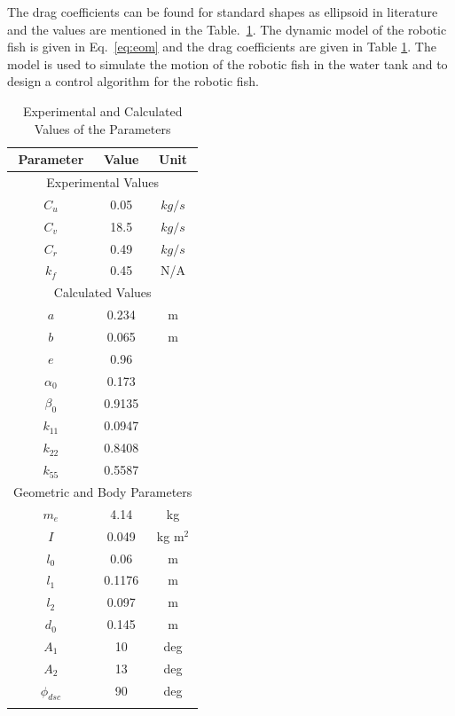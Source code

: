 \documentclass[pdflatex,sn-mathphys-num]{sn-jnl}
\theoremstyle{thmstyleone}%
\begin{document}
\par The drag coefficients can be found for standard shapes as ellipsoid in literature and the values are mentioned in the Table.~\ref{tab:exp_vals}. The dynamic model of the robotic fish is given in Eq.~\ref{eq:eom} and the drag coefficients are given in Table \ref{tab:exp_vals}. The model is used to simulate the motion of the robotic fish in the water tank and to design a control algorithm for the robotic fish.
\begin{table}[ht]
    \centering
    \begin{tabular}[width=\linewidth]{ccc}
        \toprule
        Parameter & Value & Unit \\
        \midrule
        \multicolumn{3}{c}{Experimental Values} \\
        \midrule
        $C_u$ & 0.05 & $kg/s$ \\
        $C_v$ & 18.5 & $kg/s$ \\
        $C_r$ & 0.49 & $kg/s$ \\
        $k_f$ & 0.45 & N/A \\
        \midrule
        \multicolumn{3}{c}{Calculated Values} \\
        \midrule
        $a$ & 0.234 & m \\
        $b$ & 0.065 & m \\
        $e$ & 0.96 & \\
        $\alpha_0$ & 0.173 & \\
        $\beta_0$ & 0.9135 & \\
        $k_{11}$ & 0.0947 & \\
        $k_{22}$ & 0.8408 & \\
        $k_{55}$ & 0.5587 & \\

        \midrule
        \multicolumn{3}{c}{Geometric and Body Parameters} \\
        \midrule
        $m_e$ & 4.14 & kg \\
        $I$ & 0.049 & kg m$^2$ \\
        $l_0$ & 0.06 & m \\
        $l_1$ & 0.1176 & m \\
        $l_2$ & 0.097 & m \\
        $d_0$ & 0.145 & m \\
        $A_1$ & 10 & deg \\
        $A_2$ & 13 & deg \\
        $\phi_{dsc}$ & 90 & deg \\
        \bottomrule
        \vspace{1em}
    \end{tabular}
    \caption{Experimental and Calculated Values of the Parameters}
    \label{tab:exp_vals}
\end{table}
\end{document}
